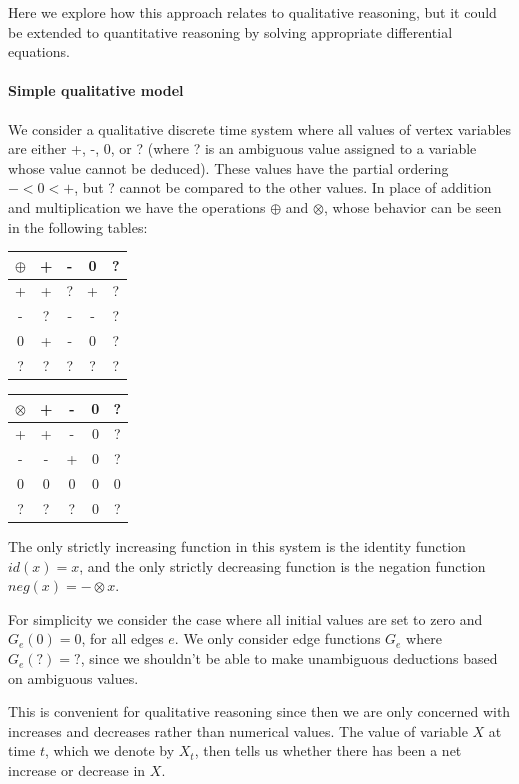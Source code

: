 \documentclass[]{article}
\begin{document}
Here we explore how this approach relates to qualitative reasoning,
but it could be extended to quantitative reasoning by solving
appropriate differential equations.

\paragraph{Simple qualitative model}

We consider a qualitative discrete time system where all values of
vertex variables are either +, -, 0, or ? (where ? is an ambiguous value assigned
to a variable whose value cannot be deduced). These values have the partial
ordering $- < 0 < +$, but ? cannot be compared to the other values. In place of
addition and multiplication we have the operations $\oplus$ and $\otimes$, whose
behavior can be seen in the following tables:
\begin{center}
\begin{tabular}{c|cccc}
$\oplus$ & + & - & 0 & ?\\
\hline
  +   & +  & ? & + & ?\\
  -   & ?  & - & - & ?\\
  0   & +  & - & 0 & ?\\
  ?   & ?  & ? & ? & ?\\
\end{tabular}
\quad
\begin{tabular}{c|cccc}
$\otimes$ & + & - & 0 & ?\\
\hline
  +   & +  & - & 0 & ?\\
  -   & -  & + & 0 & ?\\
  0   & 0  & 0 & 0 & 0\\
  ?   & ?  & ? & 0 & ?\\
\end{tabular}
\end{center}
The only
strictly increasing function in this system is the identity function $id(x) =
x$, and the only strictly decreasing function is the negation function $neg(x) =-\otimes x$.

For simplicity we consider the case where all initial values are
set to zero and $G_e(0)=0$, for all edges $e$. We only consider edge functions
$G_e$ where $G_e(?) = ?$, since we shouldn't be able to make unambiguous
deductions based on ambiguous values.
%

This is convenient for qualitative reasoning since then we are only
concerned with increases and decreases rather than numerical values.
%
The value of variable $X$ at time $t$, which we denote by $X_t$, then tells us whether there has been a net
increase or decrease in $X$.
\end{document}
